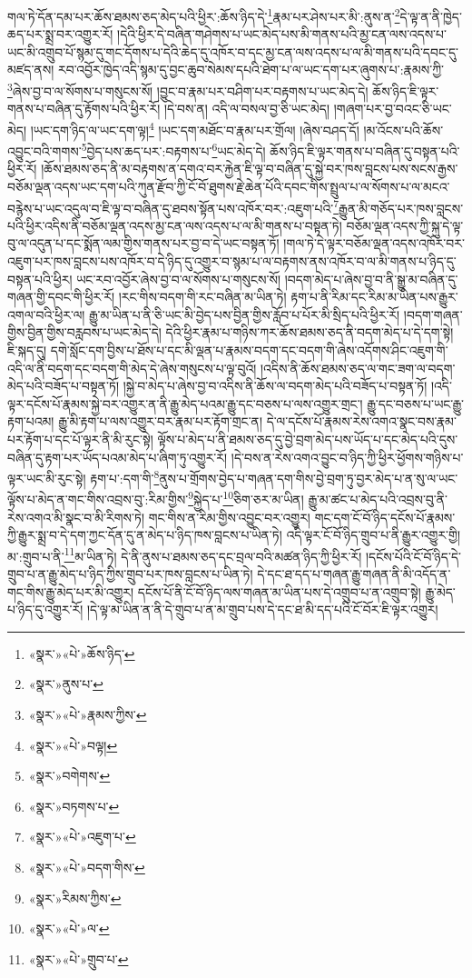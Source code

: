 གལ་ཏེ་དོན་དམ་པར་ཆོས་ཐམས་ཅད་མེད་པའི་ཕྱིར་:ཆོས་ཉིད་དེ་\footnote{«སྣར་»«པེ་»ཆོས་ཉིད་}རྣམ་པར་ཤེས་པར་མི་:ནུས་ན་\footnote{«སྣར་»ནུས་པ་}དེ་ལྟ་ན་ནི་ཁྱེད་ཆད་པར་སྨྲ་བར་འགྱུར་རོ། །དེའི་ཕྱིར་དེ་བཞིན་གཤེགས་པ་ཡང་མེད་པས་མི་གནས་པའི་མྱ་ངན་ལས་འདས་པ་ཡང་མི་འགྲུབ་པོ་སྙམ་དུ་གང་དོགས་པ་དེའི་ཆེད་དུ་འཁོར་བ་དང་མྱ་ངན་ལས་འདས་པ་ལ་མི་གནས་པའི་དབང་དུ་མཛད་ནས། རབ་འབྱོར་ཁྱེད་འདི་སྙམ་དུ་བྱང་ཆུབ་སེམས་དཔའི་ཐེག་པ་ལ་ཡང་དག་པར་ཞུགས་པ་:རྣམས་ཀྱི་\footnote{«སྣར་»«པེ་»རྣམས་ཀྱིས་}ཞེས་བྱ་བ་ལ་སོགས་པ་གསུངས་སོ། །བྱུང་བ་རྣམ་པར་བཤིག་པར་བརྟགས་པ་ཡང་མེད་དེ། ཆོས་ཉིད་ཇི་ལྟར་གནས་པ་བཞིན་དུ་རྟོགས་པའི་ཕྱིར་རོ། །དེ་བས་ན། འདི་ལ་བསལ་བྱ་ཅི་ཡང་མེད། །གཞག་པར་བྱ་བའང་ཅི་ཡང་མེད། །ཡང་དག་ཉིད་ལ་ཡང་དག་ལྟ།\footnote{«སྣར་»«པེ་»བལྟ།} །ཡང་དག་མཐོང་བ་རྣམ་པར་གྲོལ། །ཞེས་བཤད་དོ། །མ་འོངས་པའི་ཆོས་འབྱུང་བའི་གགས་\footnote{«སྣར་»བགེགས་}བྱེད་པས་ཆད་པར་:བརྟགས་པ་\footnote{«སྣར་»བཏགས་པ་}ཡང་མེད་དེ། ཆོས་ཉིད་ཇི་ལྟར་གནས་པ་བཞིན་དུ་བསྟན་པའི་ཕྱིར་རོ། །ཆོས་ཐམས་ཅད་ནི་མ་བརྟགས་ན་དགའ་བར་རྐྱེན་ཇི་ལྟ་བ་བཞིན་དུ་སྐྱེ་བར་ཁས་བླངས་པས་སངས་རྒྱས་བཅོམ་ལྡན་འདས་ཡང་དག་པའི་ཀུན་རྫོབ་ཀྱི་ངོ་བོ་ཐུགས་རྗེ་ཆེན་པོའི་དབང་གིས་སྤྲུལ་པ་ལ་སོགས་པ་ལ་མངའ་བརྙེས་པ་ཡང་འདུལ་བ་ཇི་ལྟ་བ་བཞིན་དུ་ཐབས་སྟོན་པས་འཁོར་བར་:འཇུག་པའི་\footnote{«སྣར་»«པེ་»འཇུག་པ་}རྒྱུན་མི་གཅོད་པར་ཁས་བླངས་པའི་ཕྱིར་འདིས་ནི་བཅོམ་ལྡན་འདས་མྱ་ངན་ལས་འདས་པ་ལ་མི་གནས་པ་བསྟན་ཏེ། བཅོམ་ལྡན་འདས་ཀྱི་སྐུ་དེ་ལྟ་བུ་ལ་འདུན་པ་དང་སྨོན་ལམ་གྱིས་གནས་པར་བྱ་བ་དེ་ཡང་བསྟན་ཏོ། །གལ་ཏེ་དེ་ལྟར་བཅོམ་ལྡན་འདས་འཁོར་བར་འཇུག་པར་ཁས་བླངས་པས་འཁོར་བ་དེ་ཉིད་དུ་འགྱུར་བ་སྙམ་པ་ལ་བརྟགས་ནས་འཁོར་བ་ལ་མི་གནས་པ་ཉིད་དུ་བསྟན་པའི་ཕྱིར། ཡང་རབ་འབྱོར་ཞེས་བྱ་བ་ལ་སོགས་པ་གསུངས་སོ། །བདག་མེད་པ་ཞེས་བྱ་བ་ནི་སྒྱུ་མ་བཞིན་དུ་གཞན་གྱི་དབང་གི་ཕྱིར་རོ། །རང་གིས་བདག་གི་རང་བཞིན་མ་ཡིན་ཏེ། རྟག་པ་ནི་རིམ་དང་རིམ་མ་ཡིན་པས་རྒྱུར་འགལ་བའི་ཕྱིར་ལ། རྒྱུ་མ་ཡིན་པ་ནི་ཅི་ཡང་མི་བྱེད་པས་བྱིན་གྱིས་རློབ་པ་པོར་མི་སྲིད་པའི་ཕྱིར་རོ། །བདག་གཞན་གྱིས་བྱིན་གྱིས་བརླབས་པ་ཡང་མེད་དེ། དེའི་ཕྱིར་རྣམ་པ་གཉིས་ཀར་ཆོས་ཐམས་ཅད་ནི་བདག་མེད་པ་དེ་དག་སྟེ། ཇི་སྐད་དུ། དགེ་སློང་དག་བྱིས་པ་ཐོས་པ་དང་མི་ལྡན་པ་རྣམས་བདག་དང་བདག་གི་ཞེས་འདོགས་ཤིང་འཇུག་གི་འདི་ལ་ནི་བདག་དང་བདག་གི་མེད་དེ་ཞེས་གསུངས་པ་ལྟ་བུའོ། །འདིས་ནི་ཆོས་ཐམས་ཅད་ལ་གང་ཟག་ལ་བདག་མེད་པའི་བཟོད་པ་བསྟན་ཏོ། །སྐྱེ་བ་མེད་པ་ཞེས་བྱ་བ་འདིས་ནི་ཆོས་ལ་བདག་མེད་པའི་བཟོད་པ་བསྟན་ཏོ། །འདི་ལྟར་དངོས་པོ་རྣམས་སྐྱེ་བར་འགྱུར་ན་ནི་རྒྱུ་མེད་པའམ་རྒྱུ་དང་བཅས་པ་ལས་འགྱུར་གྲང་། རྒྱུ་དང་བཅས་པ་ཡང་རྒྱུ་རྟག་པའམ། རྒྱུ་མི་རྟག་པ་ལས་འགྱུར་བར་རྣམ་པར་རྟོག་གྲང་ན། དེ་ལ་དངོས་པོ་རྣམས་རེས་འགའ་སྣང་བས་རྣམ་པར་རྟོག་པ་དང་པོ་ལྟར་ནི་མི་རུང་སྟེ། ལྟོས་པ་མེད་པ་ནི་ཐམས་ཅད་དུ་བྱེ་བྲག་མེད་པས་ཡོད་པ་དང་མེད་པའི་དུས་བཞིན་དུ་རྟག་པར་ཡོད་པའམ་མེད་པ་ཞིག་ཏུ་འགྱུར་རོ། །དེ་བས་ན་རེས་འགའ་བྱུང་བ་ཉིད་ཀྱི་ཕྱིར་ཕྱོགས་གཉིས་པ་ལྟར་ཡང་མི་རུང་སྟེ། རྟག་པ་:དག་གི་\footnote{«སྣར་»«པེ་»བདག་གིས་}ནུས་པ་གྲོགས་བྱེད་པ་གཞན་དག་གིས་བྱེ་བྲག་ཏུ་བྱར་མེད་པ་ན་སུ་ལ་ཡང་ལྟོས་པ་མེད་ན་གང་གིས་འབྲས་བུ་:རིམ་གྱིས་\footnote{«སྣར་»རིམས་ཀྱིས་}སྐྱེད་པ་\footnote{«སྣར་»«པེ་»ལ་}ཅིག་ཅར་མ་ཡིན། རྒྱུ་མ་ཚང་པ་མེད་པའི་འབྲས་བུ་ནི་རེས་འགའ་མི་སྣང་བ་མི་རིགས་ཏེ། གང་གིས་ན་རིམ་གྱིས་འབྱུང་བར་འགྱུར། གང་དག་ངོ་བོ་ཉིད་དངོས་པོ་རྣམས་ཀྱི་རྒྱུར་སྨྲ་བ་དེ་དག་ཀྱང་དོན་དུ་ན་མེད་པ་ཉིད་ཁས་བླངས་པ་ཡིན་ཏེ། འདི་ལྟར་ངོ་བོ་ཉིད་གྲུབ་པ་ནི་རྒྱུར་འགྱུར་གྱི། མ་:གྲུབ་པ་ནི་\footnote{«སྣར་»«པེ་»གྲུབ་པ་}མ་ཡིན་ཏེ། དེ་ནི་ནུས་པ་ཐམས་ཅད་དང་བྲལ་བའི་མཚན་ཉིད་ཀྱི་ཕྱིར་རོ། །དངོས་པོའི་ངོ་བོ་ཉིད་དེ་གྲུབ་པ་ན་རྒྱུ་མེད་པ་ཉིད་ཀྱིས་གྲུབ་པར་ཁས་བླངས་པ་ཡིན་ཏེ། དེ་དང་ཐ་དད་པ་གཞན་རྒྱུ་གཞན་ནི་མི་འདོད་ན་གང་གིས་རྒྱུ་མེད་པར་མི་འགྱུར། དངོས་པོ་ནི་ངོ་བོ་ཉིད་ལས་གཞན་མ་ཡིན་པས་དེ་འགྲུབ་པ་ན་འགྲུབ་སྟེ། རྒྱུ་མེད་པ་ཉིད་དུ་འགྱུར་རོ། །དེ་ལྟ་མ་ཡིན་ན་ནི་དེ་གྲུབ་པ་ན་མ་གྲུབ་པས་དེ་དང་ཐ་མི་དད་པའི་ངོ་བོར་ཇི་ལྟར་འགྱུར། 